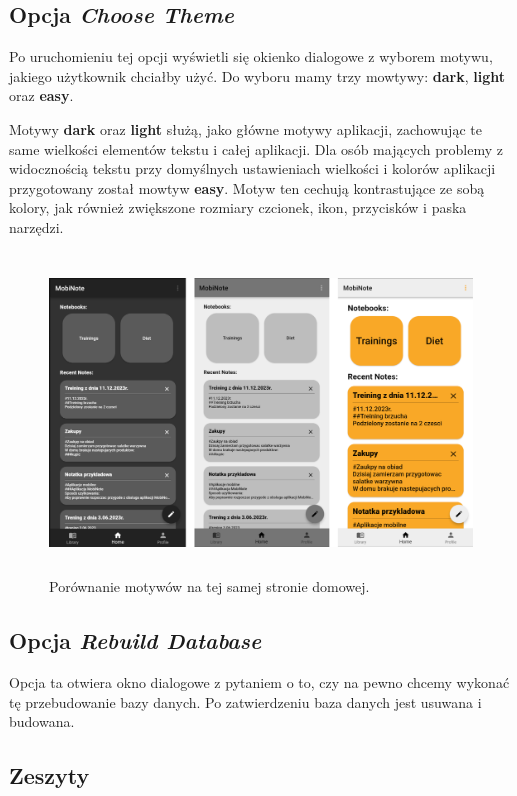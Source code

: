 \subsection{Opcja \textit{Choose Theme}}

Po uruchomieniu tej opcji wyświetli się okienko dialogowe z wyborem motywu, jakiego użytkownik chciałby użyć. Do wyboru mamy trzy mowtywy: \textbf{dark}, \textbf{light} oraz \textbf{easy}.

Motywy \textbf{dark} oraz \textbf{light} służą, jako główne motywy aplikacji, zachowując te same wielkości elementów tekstu i całej aplikacji.
Dla osób mających problemy z widocznością tekstu przy domyślnych ustawieniach wielkości i kolorów aplikacji przygotowany został mowtyw \textbf{easy}.
Motyw ten cechują kontrastujące ze sobą kolory, jak również zwiększone rozmiary czcionek, ikon, przycisków i paska narzędzi.

\begin{figure}[h]
    \centering
    \includegraphics[height=8.5cm]{images/strona_domowa_motywy.png}
    \caption{Porównanie motywów na tej samej stronie domowej.}
\end{figure}

\subsection{Opcja \textit{Rebuild Database}}

Opcja ta otwiera okno dialogowe z pytaniem o to, czy na pewno chcemy wykonać tę przebudowanie bazy danych. Po zatwierdzeniu baza danych jest usuwana i budowana.

\subsection{Zeszyty}

